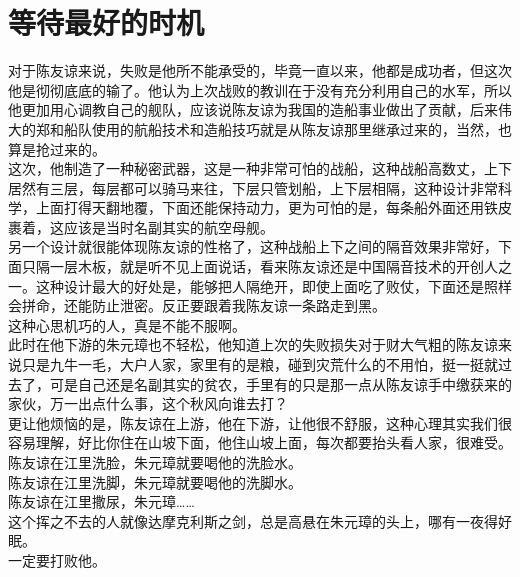 \section{等待最好的时机}
\ifnum{}
	\begin{multicols}{\theparacolNo}
\fi
对于陈友谅来说，失败是他所不能承受的，毕竟一直以来，他都是成功者，但这次他是彻彻底底的输了。他认为上次战败的教训在于没有充分利用自己的水军，所以他更加用心调教自己的舰队，应该说陈友谅为我国的造船事业做出了贡献，后来伟大的郑和船队使用的航船技术和造船技巧就是从陈友谅那里继承过来的，当然，也算是抢过来的。\\

这次，他制造了一种秘密武器，这是一种非常可怕的战船，这种战船高数丈，上下居然有三层，每层都可以骑马来往，下层只管划船，上下层相隔，这种设计非常科学，上面打得天翻地覆，下面还能保持动力，更为可怕的是，每条船外面还用铁皮裹着，这应该是当时名副其实的航空母舰。\\

另一个设计就很能体现陈友谅的性格了，这种战船上下之间的隔音效果非常好，下面只隔一层木板，就是听不见上面说话，看来陈友谅还是中国隔音技术的开创人之一。这种设计最大的好处是，能够把人隔绝开，即使上面吃了败仗，下面还是照样会拼命，还能防止泄密。反正要跟着我陈友谅一条路走到黑。\\

这种心思机巧的人，真是不能不服啊。\\

此时在他下游的朱元璋也不轻松，他知道上次的失败损失对于财大气粗的陈友谅来说只是九牛一毛，大户人家，家里有的是粮，碰到灾荒什么的不用怕，挺一挺就过去了，可是自己还是名副其实的贫农，手里有的只是那一点从陈友谅手中缴获来的家伙，万一出点什么事，这个秋风向谁去打？\\

更让他烦恼的是，陈友谅在上游，他在下游，让他很不舒服，这种心理其实我们很容易理解，好比你住在山坡下面，他住山坡上面，每次都要抬头看人家，很难受。\\

陈友谅在江里洗脸，朱元璋就要喝他的洗脸水。\\

陈友谅在江里洗脚，朱元璋就要喝他的洗脚水。\\

陈友谅在江里撒尿，朱元璋……\\

这个挥之不去的人就像达摩克利斯之剑，总是高悬在朱元璋的头上，哪有一夜得好眠。\\

一定要打败他。\\


\end{multicols}
